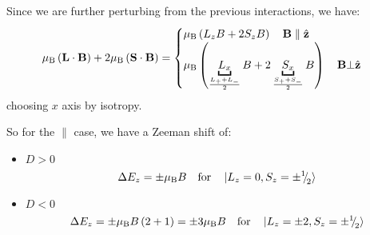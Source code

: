 \begin{parts}
	Since we are further perturbing from the previous interactions, we have:
	\begin{equation*}
		\bohrmagneton  \rbracket{\mathbf{L} \cdot \mathbf{B}} + 2\bohrmagneton  \rbracket{\mathbf{S} \cdot \mathbf{B}} =
		\begin{cases}
			\bohrmagneton  \rbracket{L_z B + 2S_z B} \hspace{1em} \mathbf{B}\parallel\hat{\mathbf{z}} \\
			\bohrmagneton  \rbracket{\underbracket{L_x}_{\frac{L_+ + L_-}{2}} B + 2 \underbracket{S_x}_{\frac{S_+ + S_-}{2}} B} \hspace{1em} \mathbf{B}\bot\hat{\mathbf{z}}
		\end{cases}
	\end{equation*}
	choosing $x$ axis by isotropy.
	
	So for the $\parallel$ case, we have a Zeeman shift of:
	\begin{itemize}
		\item \underline{$D > 0$}
		\begin{equation*}
			\Delta E_z = \pm \mu_\mathrm{B}  B \textnormal{\hspace{1em}for\hspace{1em}} \ket{L_z = 0, S_z = \pm{{}^{1}{\mskip -5mu/\mskip -3mu}_{2}}}
		\end{equation*}
		\item \underline{$D < 0$}
		\begin{equation*}
			\Delta E_z = \pm \mu_\mathrm{B}  B \left(2+1\right) = \pm 3 \mu_\mathrm{B}  B \textnormal{\hspace{1em}for\hspace{1em}} \ket{L_z = \pm 2, S_z = \pm{{}^{1}{\mskip -5mu/\mskip -3mu}_{2}}}
		\end{equation*}
	\end{itemize}
	

\end{parts}
